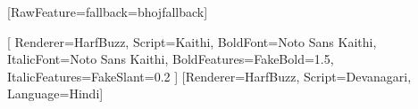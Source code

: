 \usepackage{fontspec}


\setmainfont{Noto Sans}[RawFeature={fallback=bhojfallback}]

\newfontfamily{}[
  Renderer=HarfBuzz,
  Script=Kaithi,
  BoldFont={Noto Sans Kaithi},
  ItalicFont={Noto Sans Kaithi},
  BoldFeatures={FakeBold=1.5},
  ItalicFeatures={FakeSlant=0.2}
]
\newfontfamily{}[Renderer=HarfBuzz, Script=Devanagari, Language=Hindi]

\newcommand{\K}[1]{{\kaithifont #1}}
\newcommand{\D}[1]{{\devafont #1}}


\def\bchandra{\char"11080} %
\def\banus{\char"11081}    %
\def\bvisarga{\char"11082} %

\def\ba{\char"11083}       %
\def\baa{\char"11084}      %
\def\bi{\char"11085}       %
\def\bii{\char"11086}      %
\def\bu{\char"11087}       %
\def\buu{\char"11088}      %
\def\be{\char"11089}       %
\def\bai{\char"1108A}      %
\def\bo{\char"1108B}       %
\def\bau{\char"1108C}      %

\def\bka{\char"1108D}       %
\def\bkha{\char"1108E}      %
\def\bga{\char"1108F}       %
\def\bgha{\char"11090}      %
\def\bnga{\char"11091}      %

\def\bca{\char"11092}       %
\def\bcha{\char"11093}      %
\def\bja{\char"11094}       %
\def\bjha{\char"11095}      %
\def\bnja{\char"11096}      %

\def\btta{\char"11097}      %
\def\bttha{\char"11098}     %
\def\bdda{\char"11099}      %
\def\bdddha{\char"1109A}    %
\def\bddha{\char"1109B}     %
\def\brha{\char"1109C}      %
\def\bnna{\char"1109D}      %

